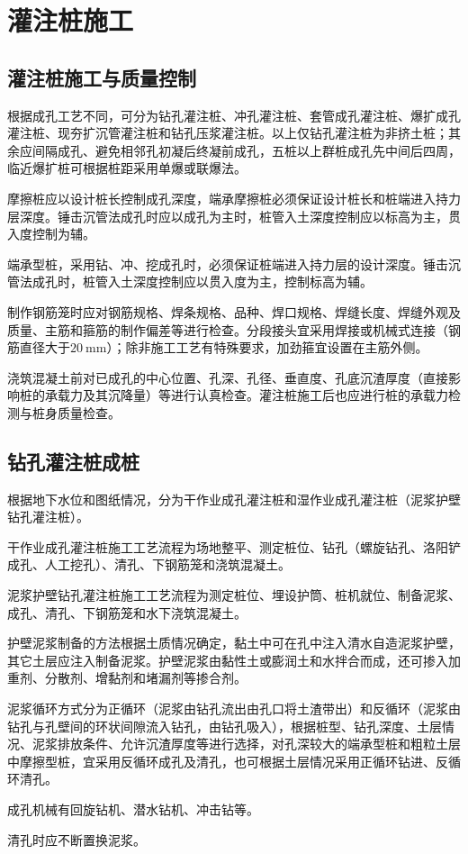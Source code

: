 \documentclass{book}
\begin{document}
\section{灌注桩施工}
\subsection{灌注桩施工与质量控制}
\par 根据成孔工艺不同，可分为钻孔灌注桩、冲孔灌注桩、套管成孔灌注桩、爆扩成孔灌注桩、现夯扩沉管灌注桩和钻孔压浆灌注桩。以上仅钻孔灌注桩为非挤土桩；其余应间隔成孔、避免相邻孔初凝后终凝前成孔，五桩以上群桩成孔先中间后四周，临近爆扩桩可根据桩距采用单爆或联爆法。
\par 摩擦桩应以设计桩长控制成孔深度，端承摩擦桩必须保证设计桩长和桩端进入持力层深度。锤击沉管法成孔时应以成孔为主时，桩管入土深度控制应以标高为主，贯入度控制为辅。
\par 端承型桩，采用钻、冲、挖成孔时，必须保证桩端进入持力层的设计深度。锤击沉管法成孔时，桩管入土深度控制应以贯入度为主，控制标高为辅。
\par 制作钢筋笼时应对钢筋规格、焊条规格、品种、焊口规格、焊缝长度、焊缝外观及质量、主筋和箍筋的制作偏差等进行检查。分段接头宜采用焊接或机械式连接（钢筋直径大于$\SI{20}{\mm}$）；除非施工工艺有特殊要求，加劲箍宜设置在主筋外侧。
\par 浇筑混凝土前对已成孔的中心位置、孔深、孔径、垂直度、孔底沉渣厚度（直接影响桩的承载力及其沉降量）等进行认真检查。灌注桩施工后也应进行桩的承载力检测与桩身质量检查。
\subsection{钻孔灌注桩成桩}
\par 根据地下水位和图纸情况，分为干作业成孔灌注桩和湿作业成孔灌注桩（泥浆护壁钻孔灌注桩）。
\par 干作业成孔灌注桩施工工艺流程为场地整平、测定桩位、钻孔（螺旋钻孔、洛阳铲成孔、人工挖孔）、清孔、下钢筋笼和浇筑混凝土。
\par 泥浆护壁钻孔灌注桩施工工艺流程为测定桩位、埋设护筒、桩机就位、制备泥浆、成孔、清孔、下钢筋笼和水下浇筑混凝土。
\par 护壁泥浆制备的方法根据土质情况确定，黏土中可在孔中注入清水自造泥浆护壁，其它土层应注入制备泥浆。护壁泥浆由黏性土或膨润土和水拌合而成，还可掺入加重剂、分散剂、增黏剂和堵漏剂等掺合剂。
\par 泥浆循环方式分为正循环（泥浆由钻孔流出由孔口将土渣带出）和反循环（泥浆由钻孔与孔壁间的环状间隙流入钻孔，由钻孔吸入），根据桩型、钻孔深度、土层情况、泥浆排放条件、允许沉渣厚度等进行选择，对孔深较大的端承型桩和粗粒土层中摩擦型桩，宜采用反循环成孔及清孔，也可根据土层情况采用正循环钻进、反循环清孔。
\par 成孔机械有回旋钻机、潜水钻机、冲击钻等。
\par 清孔时应不断置换泥浆。
\end{document}
